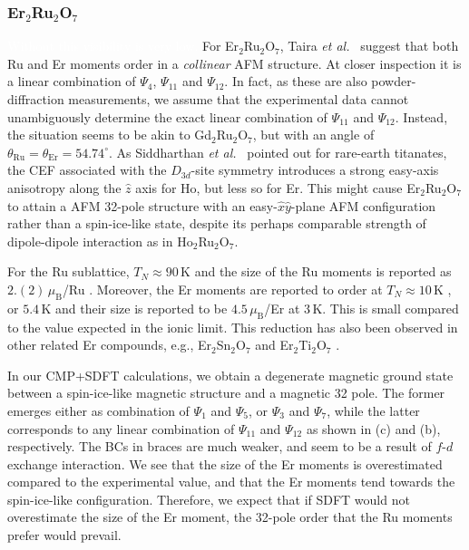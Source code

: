 \documentclass[10pt]{iopart}
\newcommand{\mub}{\,\mu_\text{B}}
\newcommand{\white}[1]{\textcolor{white}{#1}}
\begin{document}
\subsubsection{\texorpdfstring{Er$_2$Ru$_2$O$_7$}{Er2Ru2O7}} \white{Without this visibility is very low.}
\newline
For Er$_2$Ru$_2$O$_7$, Taira \emph{et al.\ }\cite{taira2003magnetic} suggest that both Ru and Er moments order in a \emph{collinear} AFM structure. At closer inspection it is a linear combination of $\Psi_4$, $\Psi_{11}$ and $\Psi_{12}$. In fact, as these are also powder-diffraction measurements, we assume that the experimental data cannot unambiguously determine the exact linear combination of $\Psi_{11}$ and $\Psi_{12}$. Instead, the situation seems to be akin to Gd$_2$Ru$_2$O$_7$, but with an angle of $\theta_{\mathrm{Ru}}=\theta_{\mathrm{Er}}=54.74^{\circ}$.
As Siddharthan \emph{et al.\ }\cite{siddharthan1999ising} pointed out for rare-earth titanates, the CEF associated with the $D_{3d}$-site symmetry introduces a strong easy-axis anisotropy along the $\hat{z}$ axis for Ho, but less so for Er. This might cause Er$_2$Ru$_2$O$_7$ to attain a AFM 32-pole structure with an easy-$\hat{x}\hat{y}$-plane AFM configuration rather than a spin-ice-like state, despite its perhaps comparable strength of dipole-dipole interaction as in Ho$_2$Ru$_2$O$_7$. 

For the Ru sublattice, $T_N\approx90\,$K \cite{taira2003magnetic} and the size of the Ru moments is reported as $2.(2) \mub$/Ru \cite{taira2002magnetic, taira2003magnetic}. Moreover, the Er moments are reported to order at $T_N\approx10\,$K \cite{taira2003magnetic,gardner2010magnetic}, or $5.4\,$K \cite{taira2002magnetic} and their size is reported to be $4.5 \mub$/Er \cite{taira2003magnetic} at $3\,$K. This is small compared to the value expected in the ionic limit. This reduction has also been observed in other related Er compounds, e.g., Er$_2$Sn$_2$O$_7$\cite{matsuhira2002low} and Er$_2$Ti$_2$O$_7$ \cite{bramwell2000bulk}.   

In our CMP+SDFT calculations, we obtain a degenerate magnetic ground state between a spin-ice-like magnetic structure and a magnetic 32 pole. The former emerges either as combination of $\Psi_1$ and $\Psi_5$, or $\Psi_3$ and $\Psi_7$, while the latter corresponds to any linear combination of $\Psi_{11}$ and $\Psi_{12}$ as shown in  (c) and (b), respectively. The BCs in braces are much weaker, and seem to be a result of $f$-$d$ exchange interaction. We see that the size of the Er moments is overestimated compared to the experimental value, and that the Er moments tend towards the spin-ice-like configuration. Therefore, we expect that if SDFT would not overestimate the size of the Er moment, the 32-pole order that the Ru moments prefer would prevail.
\end{document}
